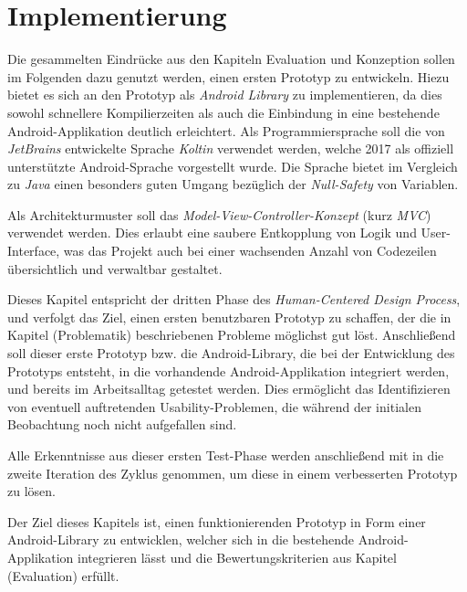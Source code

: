 \chapter{Implementierung}

Die gesammelten Eindrücke aus den Kapiteln Evaluation und Konzeption sollen im Folgenden dazu genutzt werden, einen ersten Prototyp zu entwickeln.
Hiezu bietet es sich an den Prototyp als \emph{Android Library}  zu implementieren, da dies sowohl schnellere Kompilierzeiten als auch die Einbindung in eine bestehende Android-Applikation deutlich erleichtert.
Als Programmiersprache soll die von \emph{JetBrains} entwickelte Sprache \emph{Koltin} verwendet werden, welche 2017 als offiziell unterstützte Android-Sprache vorgestellt wurde.
Die Sprache bietet im Vergleich zu \emph{Java} einen besonders guten Umgang bezüglich der \emph{Null-Safety} von Variablen. 


Als Architekturmuster soll das \emph{Model-View-Controller-Konzept} (kurz \emph{MVC}) verwendet werden.
Dies erlaubt eine saubere Entkopplung von Logik und User-Interface, was das Projekt auch bei einer wachsenden Anzahl von Codezeilen übersichtlich und verwaltbar gestaltet.

Dieses Kapitel entspricht der dritten Phase des \emph{Human-Centered Design Process}, und verfolgt das Ziel, einen ersten benutzbaren Prototyp zu schaffen, der die in Kapitel (Problematik) beschriebenen Probleme möglichst gut löst. Anschließend soll dieser erste Prototyp bzw. die Android-Library, die bei der Entwicklung des Prototyps entsteht, in die vorhandende Android-Applikation integriert werden, und bereits im Arbeitsalltag getestet werden.
Dies ermöglicht das Identifizieren von eventuell auftretenden Usability-Problemen, die während der initialen Beobachtung noch nicht aufgefallen sind.

Alle Erkenntnisse aus dieser ersten Test-Phase werden anschließend mit in die zweite Iteration des Zyklus genommen, um diese in einem verbesserten Prototyp zu lösen.

Der Ziel dieses Kapitels ist, einen funktionierenden Prototyp in Form einer Android-Library zu entwicklen, welcher sich in die bestehende Android-Applikation integrieren lässt und die Bewertungskriterien aus Kapitel (Evaluation) erfüllt.





